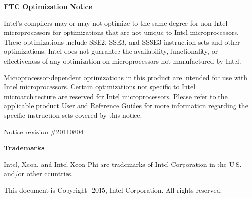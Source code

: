\documentclass{book}
\begin{document}
\hypersetup{pageanchor=false,citecolor=blue}

{\bf FTC Optimization Notice}

Intel's compilers may or may not optimize to the same degree for non-Intel microprocessors for
optimizations that are not unique to Intel microprocessors. These optimizations include SSE2,
SSE3, and SSSE3 instruction sets and other optimizations. Intel does not guarantee the
availability, functionality, or effectiveness of any optimization on microprocessors not
manufactured by Intel.

Microprocessor-dependent optimizations in this product are intended for use with Intel
microprocessors. Certain optimizations not specific to Intel microarchitecture are reserved for
Intel microprocessors. Please refer to the applicable product User and Reference Guides for
more information regarding the specific instruction sets covered by this notice.

Notice revision \#20110804

\vspace*{0.5cm}

{\bf Trademarks}

Intel, Xeon, and Intel Xeon Phi are trademarks of Intel Corporation in the U.S. and/or other countries.

This document is Copyright -2015, Intel Corporation. All rights reserved.

\tableofcontents
{}
\hypersetup{pageanchor=true,citecolor=blue}
\end{document}
